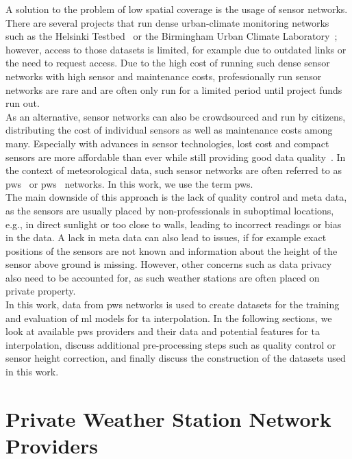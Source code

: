 A solution to the problem of low spatial coverage is the usage of sensor networks. There are several projects that run dense urban-climate monitoring networks~\cite{muller2013sensors} such as the Helsinki Testbed~\cite{koskinen2011helsinki} or the Birmingham Urban Climate Laboratory~\cite{warren2016birmingham}; however, access to those datasets is limited, for example due to outdated links or the need to request access. Due to the high cost of running such dense sensor networks with high sensor and maintenance costs, professionally run sensor networks are rare and are often only run for a limited period until project funds run out.\\
As an alternative, sensor networks can also be crowdsourced and run by citizens, distributing the cost of individual sensors as well as maintenance costs among many. Especially with advances in sensor technologies, lost cost and compact sensors are more affordable than ever while still providing good data quality~\cite{grimmond2006progress, rundel2009environmental}. In the context of meteorological data, such sensor networks are often referred to as \gls{pws}~\cite{meier2017crowdsourcing} or \gls{pws}~\cite{hahn2022observations} networks. In this work, we use the term \gls{pws}.\\
The main downside of this approach is the lack of quality control and meta data, as the sensors are usually placed by non-professionals in suboptimal locations, e.g., in direct sunlight or too close to walls, leading to incorrect readings or bias in the data. A lack in meta data can also lead to issues, if for example exact positions of the sensors are not known and information about the height of the sensor above ground is missing. However, other concerns such as data privacy also need to be accounted for, as such weather stations are often placed on private property.\\
In this work, data from \gls{pws} networks is used to create datasets for the training and evaluation of \gls{ml} models for \gls{ta} interpolation. In the following sections, we look at available \gls{pws} providers and their data and potential features for \gls{ta} interpolation, discuss additional pre-processing steps such as quality control or sensor height correction, and finally discuss the construction of the datasets used in this work.

\section{Private Weather Station Network Providers}
\label{sec: private weather station network providers}

